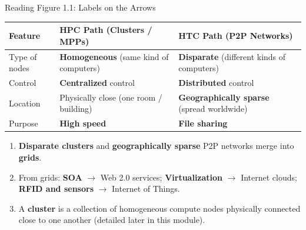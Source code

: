 \begin{frame}{Reading Figure 1.1: Labels on the Arrows}
\begin{table}
\centering
\renewcommand{\arraystretch}{1.3}
\scriptsize
\begin{tabular}{|p{3.2cm}|p{4.6cm}|p{4.6cm}|}
\hline
\textbf{Feature} & \textbf{HPC Path (Clusters / MPPs)} & \textbf{HTC Path (P2P Networks)} \\ \hline
Type of nodes & \textbf{Homogeneous} (same kind of computers) & \textbf{Disparate} (different kinds of computers) \\ \hline
Control & \textbf{Centralized} control & \textbf{Distributed} control \\ \hline
Location & Physically close (one room / building) & \textbf{Geographically sparse} (spread worldwide) \\ \hline
Purpose & \textbf{High speed} & \textbf{File sharing} \\ \hline
\end{tabular}
\end{table}
\begin{enumerate}
\item<1-> \textbf{Disparate clusters} and \textbf{geographically sparse} P2P networks merge into \textbf{grids}.
\item<2-> From grids: \textbf{SOA} $\rightarrow$ Web 2.0 services; \textbf{Virtualization} $\rightarrow$ Internet clouds; \textbf{RFID and sensors} $\rightarrow$ Internet of Things.
\item<3-> A \textbf{cluster} is a collection of homogeneous compute nodes physically connected close to one another (detailed later in this module).
\end{enumerate}
\end{frame}

